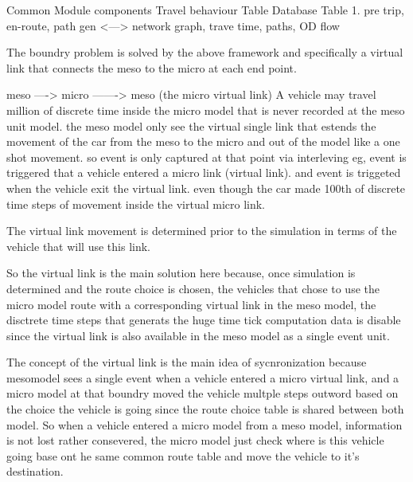 \begin{bibunit}[plainnat]
            Common Module components
Travel behaviour Table                              Database Table
1. pre trip, en-route, path gen   <--->       network graph, trave time, paths, OD flow

The boundry problem is solved by the above framework and specifically a virtual link that connects the meso to the micro at each end point. 

meso ---->    micro -------> meso  (the micro virtual link)
A vehicle may travel million of discrete time inside the micro model that is never recorded at the meso unit model. 
the meso model only see the virtual single link that estends the movement of the car from the meso to the micro and out of the model like a one shot movement. 
so event is only captured at that point via interleving eg, event is triggered that a vehicle entered a micro link (virtual link). and 
event is triggeted when the vehicle exit the virtual link. even though the car made 100th of discrete time steps of movement inside the virtual micro link. 

The virtual link movement is determined prior to the simulation in terms of the vehicle that will use this link. 

So the virtual link is the main solution here because, once simulation is determined and the route choice is chosen, the vehicles that chose to use 
the micro model route with a corresponding virtual link in the meso model, the disctrete time steps that generats the huge time tick computation data is 
disable since the virtual link is also available in the meso model as a single event unit. 

The concept of the virtual link is the main idea of sycnronization because mesomodel sees a single event when a vehicle entered 
a micro virtual link, and a micro model at that boundry moved the vehicle multple steps outword based on the choice the vehicle 
is going since the route choice table is shared between both model. So when a vehicle entered a micro model 
from a meso model, information is not lost rather consevered, the micro model just check where is this vehicle 
going base ont he same common route table and move the vehicle to it's destination. 




\end{bibunit}
